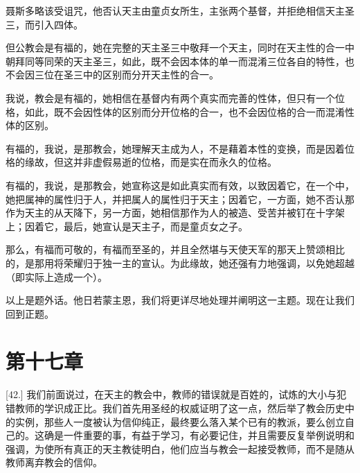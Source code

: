 聂斯多略该受诅咒，他否认天主由童贞女所生，主张两个基督，并拒绝相信天主圣三，而引入四体。\par

但公教会是有福的，她在完整的天主圣三中敬拜一个天主，同时在天主性的合一中朝拜同等同荣的天主圣三，如此，既不会因本体的单一而混淆三位各自的特性，也不会因三位在圣三中的区别而分开天主性的合一。\par

我说，教会是有福的，她相信在基督内有两个真实而完善的性体，但只有一个位格，如此，既不会因性体的区别而分开位格的合一，也不会因位格的合一而混淆性体的区别。\par

有福的，我说，是那教会，她理解天主成为人，不是藉着本性的变换，而是因着位格的缘故，但这并非虚假易逝的位格，而是实在而永久的位格。\par

有福的，我说，是那教会，她宣称这是如此真实而有效，以致因着它，在一个中，她把属神的属性归于人，并把属人的属性归于天主；因着它，一方面，她不否认那作为天主的从天降下，另一方面，她相信那作为人的被造、受苦并被钉在十字架上；因着它，最后，她宣认是天主子，而是童贞女之子。\par

那么，有福而可敬的，有福而至圣的，并且全然堪与天使天军的那天上赞颂相比的，是那用将荣耀归于独一主的宣认。为此缘故，她还强有力地强调，以免她超越（即实际上造成一个）。\par

以上是题外话。他日若蒙主恩，我们将更详尽地处理并阐明这一主题。现在让我们回到正题。\par


\section{第十七章}

\par

[42.] 我们前面说过，在天主的教会中，教师的错误就是百姓的，试炼的大小与犯错教师的学识成正比。我们首先用圣经的权威证明了这一点，然后举了教会历史中的实例，那些人一度被认为信仰纯正，最终要么落入某个已有的教派，要么创立自己的。这确是一件重要的事，有益于学习，有必要记住，并且需要反复举例说明和强调，为使所有真正的天主教徒明白，他们应当与教会一起接受教师，而不是随从教师离弃教会的信仰。\par

